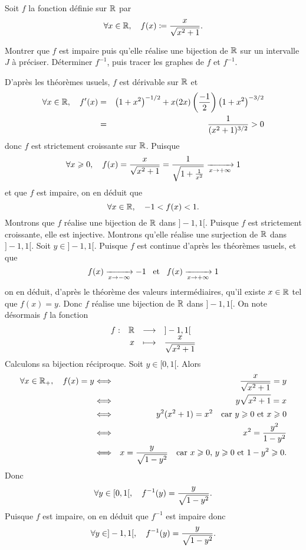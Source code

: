 \documentclass{magnolia}
\begin{document}


Soit $f$ la fonction définie sur $\mathbb{R}$ par
\[\forall x\in\mathbb{R},\quad f(x)\coloneqq\frac{x}{\sqrt{x^2+1}}.\]
\begin{questions}
\question Montrer que $f$ est impaire puis qu'elle réalise une bijection de $\mathbb{R}$ sur un intervalle
  $J$ à préciser. 
\question Déterminer $f^{-1}$, puis tracer les graphes de $f$ et $f^{-1}$.
\end{questions}
\begin{sol}
D'après les théorèmes usuels, $f$ est dérivable sur $\mathbb{R}$ et
\begin{eqnarray*}
\forall x \in \mathbb{R},\quad f'(x)
&=&\left(1+x^2\right)^{-1/2}+x(2x)\left(\frac{-1}{2}\right)\left(1+x^2\right)^{-3/2}\\
&=&\frac{1}{(x^2+1)^{3/2}}>0
\end{eqnarray*}
donc $f$ est strictement croissante sur $\mathbb{R}$. Puisque
\[\forall x\geqslant 0,\quad f(x)=\frac{x}{\sqrt{x^2+1}}=\frac{1}{\sqrt{1+\frac{1}{x^2}}}\xrightarrow[x\rightarrow +\infty]{} 1\]
et que $f$ est impaire, on en déduit que
\[\forall x\in\mathbb{R},\quad -1<f(x)<1.\]
Montrons que $f$ réalise une bijection de $\mathbb{R}$ dans $]-1,1[$. Puisque $f$ est strictement croissante, elle est injective. Montrons qu'elle réalise une surjection de $\mathbb{R}$ dans $]-1,1[$. Soit $y\in]-1,1[$. Puisque $f$ est continue d'après les théorèmes usuels, et que 
\[f(x)\xrightarrow[x\rightarrow -\infty]{}-1 \quad\!\text{et}\quad\! f(x)\xrightarrow[x\rightarrow +\infty]{}1\]
on en déduit, d'après le théorème des valeurs intermédiaires, qu'il existe $x\in\mathbb{R}$ tel que $f(x)=y$. Donc $f$ réalise une bijection de $\mathbb{R}$ dans $]-1,1[$. On note désormais $f$ la fonction
\[\begin{array}[t]{lrcl} \displaystyle{f} : & \displaystyle{\mathbb{R}} & \longrightarrow & \displaystyle{]-1,1[} \\ & \displaystyle{x} & \longmapsto & \displaystyle{\frac{x}{\sqrt{x^2+1}}} \end{array}\]
Calculons sa bijection réciproque. Soit $y\in[0,1[$. Alors
\begin{eqnarray*}
\forall x\in\mathbb{R}_+,\quad f(x)=y
&\Longleftrightarrow& \frac{x}{\sqrt{x^2+1}}=y\\
&\Longleftrightarrow& y\sqrt{x^2+1}=x\\
&\Longleftrightarrow& y^2(x^2+1)=x^2 \quad\text{car $y\geqslant 0$ et $x\geqslant 0$}\\
&\Longleftrightarrow& x^2=\frac{y^2}{1-y^2}\\
&\Longleftrightarrow& x=\frac{y}{\sqrt{1-y^2}} \quad\text{car $x\geqslant 0$, $y\geqslant 0$ et $1-y^2\geqslant 0$.}
\end{eqnarray*}
Donc
\[\forall y\in[0,1[,\quad f^{-1}(y)=\frac{y}{\sqrt{1-y^2}}.\]
Puisque $f$ est impaire, on en déduit que $f^{-1}$ est impaire donc
\[\forall y\in]-1,1[,\quad f^{-1}(y)=\frac{y}{\sqrt{1-y^2}}.\]
\end{sol}
\end{document}
